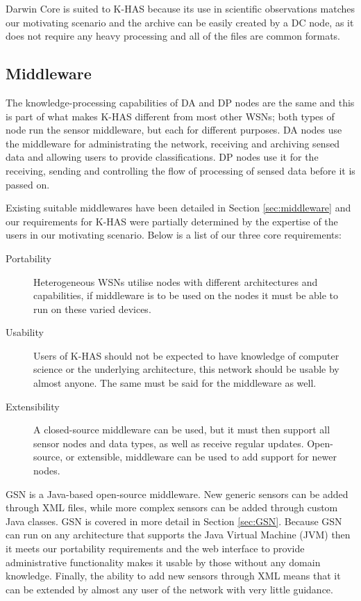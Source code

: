 Darwin Core is suited to K-HAS because its use in scientific observations matches our motivating scenario and the archive can be easily created by a DC node, as it does not require any heavy processing and all of the files are common formats.
	
	\subsection{Middleware}
	The knowledge-processing capabilities of DA and DP nodes are the same and this is part of what makes K-HAS different from most other WSNs; both types of node run the sensor middleware, but each for different purposes. DA nodes use the middleware for administrating the network, receiving and archiving sensed data and allowing users to provide classifications. DP nodes use it for the receiving, sending and controlling the flow of processing of sensed data before it is passed on.
	
	Existing suitable middlewares have been detailed in Section \ref{sec:middleware} and our requirements for K-HAS were partially determined by the expertise of the users in our motivating scenario. Below is a list of our three core requirements:
	\begin{description}
		\item[Portability] Heterogeneous WSNs utilise nodes with different architectures and capabilities, if middleware is to be used on the nodes it must be able to run on these varied devices. 
		\item[Usability] Users of K-HAS should not be expected to have knowledge of computer science or the underlying architecture, this network should be usable by almost anyone. The same must be said for the middleware as well.
		\item[Extensibility] A closed-source middleware can be used, but it must then support all sensor nodes and data types, as well as receive regular updates. Open-source, or extensible, middleware can be used to add support for newer nodes.
	\end{description}
	
	GSN is a Java-based open-source middleware. New generic sensors can be added through XML files, while more complex sensors can be added through custom Java classes. GSN is covered in more detail in Section \ref{sec:GSN}. Because GSN can run on any architecture that supports the Java Virtual Machine (JVM) then it meets our portability requirements and the web interface to provide administrative functionality makes it usable by those without any domain knowledge. Finally, the ability to add new sensors through XML means that it can be extended by almost any user of the network with very little guidance.
		
